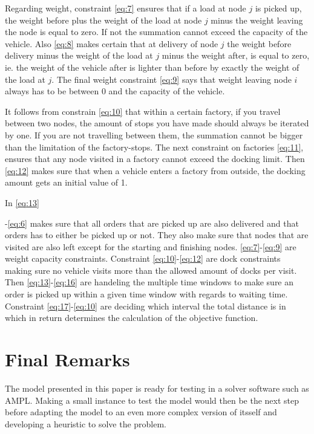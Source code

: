 \documentclass[a4paper,10pt]{article}
\begin{document}
Regarding weight, constraint \ref{eq:7} ensures that if a load at node $j$ is picked up, the weight before plus the weight of the load at node $j$ minus the weight leaving the node is equal to zero. If not the summation cannot exceed the capacity of the vehicle.
Also \ref{eq:8} makes certain that at delivery of node $j$ the weight before delivery minus the weight of the load at $j$ minus the weight after, is equal to zero, ie. the weight of the vehicle after is lighter than before by exactly the weight of the load at $j$. The final weight constraint \ref{eq:9} says that weight leaving node $i$ always has to be between $0$ and the capacity of the vehicle. \par

It follows from constrain \ref{eq:10} that within a certain factory, if you travel between two nodes, the amount of stops you have made should always be iterated by one. If you are not travelling between them, the summation cannot be bigger than the limitation of the factory-stops.
The next constraint on factories \ref{eq:11}, ensures that any node visited in a factory cannot exceed the docking limit.
Then \ref{eq:12} makes sure that when a vehicle enters a factory from outside, the docking amount gets an initial value of 1. \par

In \ref{eq:13} 


-\ref{eq:6} makes sure that all orders that are picked up are also delivered and that orders has to either be picked up or not. They also make sure that nodes that are visited are also left except for the starting and finishing nodes.
\ref{eq:7}-\ref{eq:9} are weight capacity constraints.
Constraint \ref{eq:10}-\ref{eq:12} are dock constraints making sure no vehicle visits more than the allowed amount of docks per visit.
Then \ref{eq:13}-\ref{eq:16} are handeling the multiple time windows to make sure an order is picked up within a given time window with regards to waiting time.
Constraint \ref{eq:17}-\ref{eq:10} are deciding which interval the total distance is in which in return determines the calculation of the objective function. \newline

\section{Final Remarks}
The model presented in this paper is ready for testing in a solver software such as AMPL. Making a small instance to test the model would then be the next step before adapting the model to an even more complex version of itsself and developing a heuristic to solve the problem. 




\end{document}
